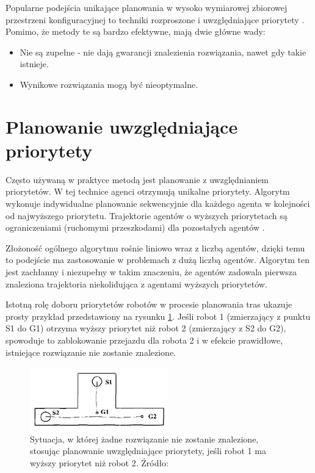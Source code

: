 Popularne podejścia unikające planowania w wysoko wymiarowej zbiorowej przestrzeni konfiguracyjnej to techniki rozproszone i uwzględniające priorytety \cite{optpriorities}.
Pomimo, że metody te są bardzo efektywne, mają dwie główne wady:
\vspace{-0.5em}
\begin{itemize}[noitemsep]
	\item Nie są zupełne - nie dają gwarancji znalezienia rozwiązania, nawet gdy takie istnieje.
	\item Wynikowe rozwiązania mogą być nieoptymalne.
\end{itemize}


\section{Planowanie uwzględniające priorytety}
Często używaną w praktyce metodą jest planowanie z uwzględnianiem priorytetów. 
W tej technice agenci otrzymują unikalne priorytety. Algorytm wykonuje indywidualne planowanie sekwencyjnie dla każdego agenta w kolejności od najwyższego priorytetu. Trajektorie agentów o wyższych priorytetach są ograniczeniami (ruchomymi przeszkodami) dla pozostałych agentów \cite{async_decentralized_spacetime_cp}.

Złożoność ogólnego algorytmu rośnie liniowo wraz z liczbą agentów, dzięki temu to podejście ma zastosowanie w problemach z dużą liczbą agentów.
Algorytm ten jest zachłanny i niezupełny w takim znaczeniu, że agentów zadowala pierwsza znaleziona trajektoria niekolidująca z agentami wyższych priorytetów. 

Istotną rolę doboru priorytetów robotów w procesie planowania tras ukazuje prosty przykład przedstawiony na rysunku \ref{fig:image_article1_fig1}. Jeśli robot 1 (zmierzający z punktu S1 do G1) otrzyma wyższy priorytet niż robot 2 (zmierzający z S2 do G2), spowoduje to zablokowanie przejazdu dla robota 2 i w efekcie prawidłowe, istniejące rozwiązanie nie zostanie znalezione.
\begin{figure}
	\centering
	\includegraphics[width=6cm]{img/article1/fig1}
	\caption{Sytuacja, w której żadne rozwiązanie nie zostanie znalezione, stosując planowanie uwzględniające priorytety, jeśli robot 1 ma wyższy priorytet niż robot 2. Źródło: \cite{optpriorities}}
	\label{fig:image_article1_fig1}
\end{figure}

